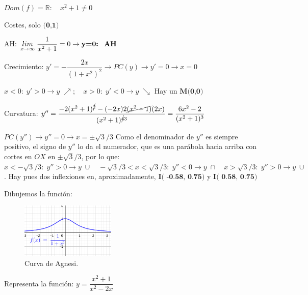\begin{proofw}\renewcommand{\qedsymbol}{$\diamond$}	

$Dom(f)=\mathbb R: \quad x^2+1\neq 0$

Costes, solo $\textbf{(0,1)}$

AH: $\underset {x\to \infty}{lim }\;{ \dfrac {1}{x^2+1}  }=0 \to \textbf{y=0:\; AH}$

Crecimiento: $y'=-\dfrac {2x}{(1+x^2)^2} \to PC(y) \to y'=0 \to x=0$

$x<0: \; y'>0 \to y\; \nearrow; \quad x>0:\; y'<0 \to y\; \searrow$ Hay un $\textbf{M(0,0)}$
	
Curvatura: $y''=\dfrac {-2(x^2+1)^{\cancel{2}}-(-2x)2\cancel{(x^2+1)}(2x)}{(x^2+1)^{\cancel{4}3}}=\dfrac {6x^2-2}{(x^2+1)^3}$
\begin{multicols}{2}
	
$PC(y'') \to y''=0 \to x=\pm \sqrt{3}/3$ Como el denominador de $y''$ es siempre positivo, el signo de $y''$ lo da el numerador, que es una parábola hacia arriba con cortes en $OX$ en $\pm \sqrt{3}/3$, por lo que: $x<-\sqrt{3}/3:\; y''>0 \to y\; \cup \quad -\sqrt{3}/3<x<\sqrt{3}/3:\; y''<0 \to y\; \cap \quad x>\sqrt{3}/3: \; y''>0 \to y\; \cup$. Hay pues dos inflexiones en, aproximadamente,  $\textbf{I( -0.58, 0.75)}$ y $\textbf{I( 0.58, 0.75)}$

Dibujemos la función:
		\begin{figure}[H]
			\centering
			\includegraphics[width=0.4\textwidth]{imagenes/imagenes05/T05IM31.png}
			\caption{Curva de Agnesi.}
		\end{figure}
\end{multicols}

\end{proofw}


\begin{ejre} Representa la función: $y=\dfrac {x^2+1}{x^2-2x}$

	
\end{ejre}

